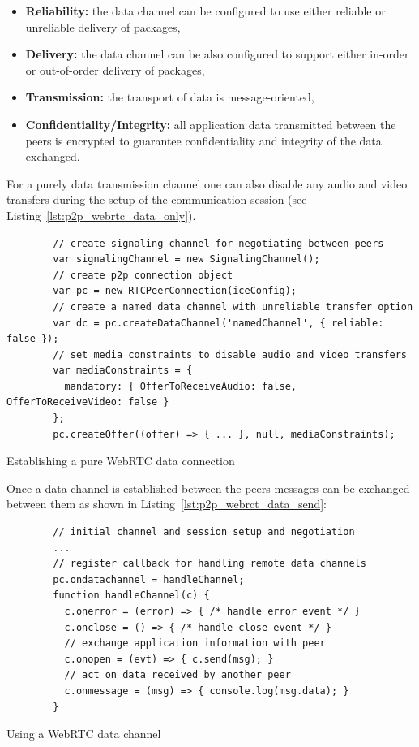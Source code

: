 \begin{itemize}
		\item \textbf{Reliability:} the data channel can be configured to use either reliable or unreliable delivery of packages,
		\item \textbf{Delivery:} the data channel can be also configured to support either in-order or out-of-order delivery of packages,
		\item \textbf{Transmission:} the transport of data is message-oriented,
		\item \textbf{Confidentiality/Integrity:} all application data transmitted between the peers is encrypted to guarantee confidentiality and integrity of the data exchanged.
\end{itemize}

For a purely data transmission channel one can also disable any audio and video transfers during the setup of the communication session (see Listing~\ref{lst:p2p_webrtc_data_only}). \@

\begin{listing}[H]
	\begin{verbatim}
		// create signaling channel for negotiating between peers
		var signalingChannel = new SignalingChannel();
		// create p2p connection object
		var pc = new RTCPeerConnection(iceConfig);
		// create a named data channel with unreliable transfer option
		var dc = pc.createDataChannel('namedChannel', { reliable: false });
		// set media constraints to disable audio and video transfers
		var mediaConstraints = {
		  mandatory: { OfferToReceiveAudio: false, OfferToReceiveVideo: false }
		};
		pc.createOffer((offer) => { ... }, null, mediaConstraints);
	\end{verbatim}
\caption[Establishing a pure \gls{WebRTC} data connection]{Establishing a pure \gls{WebRTC} data connection \citep[pg. 349]{grigorik2013high}}
\label{lst:p2p_webrtc_data_only}
\end{listing}

Once a data channel is established between the peers messages can be exchanged between them as shown in Listing~\ref{lst:p2p_webrct_data_send}: \@

\begin{listing}[H]
	\begin{verbatim}
		// initial channel and session setup and negotiation
		...
		// register callback for handling remote data channels
		pc.ondatachannel = handleChannel;
		function handleChannel(c) {
		  c.onerror = (error) => { /* handle error event */ }
		  c.onclose = () => { /* handle close event */ }
		  // exchange application information with peer
		  c.onopen = (evt) => { c.send(msg); }
		  // act on data received by another peer
		  c.onmessage = (msg) => { console.log(msg.data); }
		}
	\end{verbatim}
\caption[Using a \gls{WebRTC} data channel]{Using a \gls{WebRTC} data channel \citep[pg. 346]{grigorik2013high}}
\label{lst:p2p_webrct_data_send}
\end{listing}


